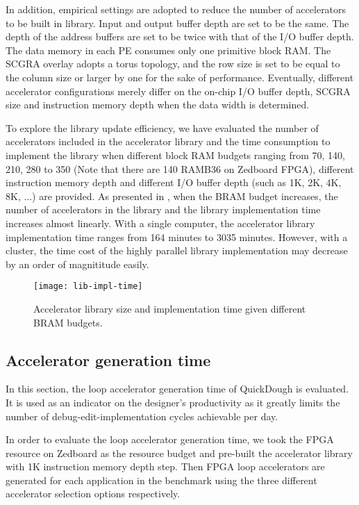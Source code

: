 In addition, empirical settings are adopted to reduce the number of accelerators to be built in
library. Input and output buffer depth are set to be the same. The depth of the address buffers are
set to be twice with that of the I/O buffer depth. The data memory in each PE consumes only one
primitive block RAM. The SCGRA overlay adopts a torus topology, and the row size is set to be equal
to the column size or larger by one for the sake of performance. Eventually, different accelerator
configurations merely differ on the on-chip I/O buffer depth, SCGRA size and instruction memory depth
when the data width is determined. 

To explore the library update efficiency, we have evaluated the number of accelerators included in
the accelerator library and the time consumption to implement the library when different block RAM
budgets ranging from 70, 140, 210, 280 to 350 (Note that there are 140 RAMB36 on Zedboard FPGA),
different instruction memory depth and different I/O buffer depth (such as 1K, 2K, 4K, 8K, ...) are provided.
As presented in , when the BRAM budget increases, the number of accelerators
in the library and the library implementation time increases almost linearly. With a single
computer, the accelerator library implementation time ranges from 164 minutes to 3035 minutes.
However, with a cluster, the time cost of the highly parallel library implementation may decrease by
an order of magnititude easily.

\begin{figure}
\centering
\texttt{[image: lib-impl-time]}
\caption{Accelerator library size and implementation time given different BRAM budgets.}
\label{fig:lib-impl-time}
\end{figure}

\subsection{Accelerator generation time} \label{subsec:acc-gen}
In this section, the loop accelerator generation time of QuickDough is evaluated. 
It is used as an indicator on the designer's productivity as it greatly limits 
the number of debug-edit-implementation cycles achievable per day. 

In order to evaluate the loop accelerator generation time, we took the FPGA resource on Zedboard as
the resource budget and pre-built the accelerator library with 1K instruction memory depth step.
Then FPGA loop accelerators are generated for each application in the benchmark using the three
different accelerator selection options respectively.  

